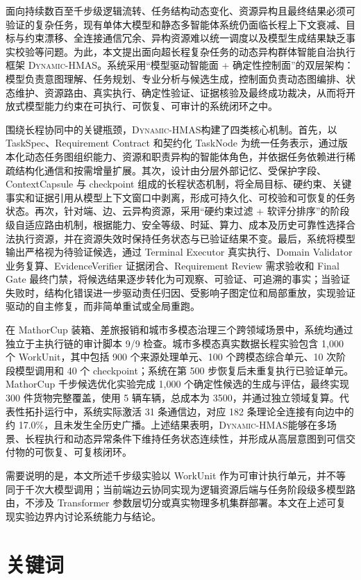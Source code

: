 \documentclass[UTF8,a4paper,12pt,oneside]{ctexbook}
\newcommand{\sys}{\textsc{Dynamic-HMAS}}
\begin{document}
面向持续数百至千步级逻辑流转、任务结构动态变化、资源异构且最终结果必须可验证的复杂任务，现有单体大模型和静态多智能体系统仍面临长程上下文衰减、目标与约束漂移、全连接通信冗余、异构资源难以统一调度以及模型生成结果缺乏事实校验等问题。为此，本文提出面向超长程复杂任务的动态异构群体智能自治执行框架 \sys{}。系统采用“模型驱动智能面 + 确定性控制面”的双层架构：模型负责意图理解、任务规划、专业分析与候选生成，控制面负责动态图编排、状态维护、资源路由、真实执行、确定性验证、证据核验及最终成功裁决，从而将开放式模型能力约束在可执行、可恢复、可审计的系统闭环之中。

围绕长程协同中的关键瓶颈，\sys{}构建了四类核心机制。首先，以 TaskSpec、Requirement Contract 和契约化 TaskNode 为统一任务表示，通过版本化动态任务图组织能力、资源和职责异构的智能体角色，并依据任务依赖进行稀疏结构化通信和按需增量扩展。其次，设计由分层外部记忆、受保护字段、ContextCapsule 与 checkpoint 组成的长程状态机制，将全局目标、硬约束、关键事实和证据引用从模型上下文窗口中剥离，形成可持久化、可校验和可恢复的任务状态。再次，针对端、边、云异构资源，采用“硬约束过滤 + 软评分排序”的阶段级自适应路由机制，根据能力、安全等级、时延、算力、成本及历史可靠性选择合法执行资源，并在资源失效时保持任务状态与已验证结果不变。最后，系统将模型输出严格视为待验证候选，通过 Terminal Executor 真实执行、Domain Validator 业务复算、EvidenceVerifier 证据闭合、Requirement Review 需求验收和 Final Gate 最终门禁，将候选结果逐步转化为可观察、可验证、可追溯的事实；当验证失败时，结构化错误进一步驱动责任归因、受影响子图定位和局部重放，实现验证驱动的自主修复，而非简单重试或全局重跑。

在 MathorCup 装箱、差旅报销和城市多模态治理三个跨领域场景中，系统均通过独立于主执行链的审计脚本 9/9 检查。城市多模态真实数据长程实验包含 1,000 个 WorkUnit，其中包括 900 个来源处理单元、100 个跨模态综合单元、10 次阶段模型调用和 40 个 checkpoint；系统在第 500 步恢复后未重复执行已验证单元。MathorCup 千步候选优化实验完成 1,000 个确定性候选的生成与评估，最终实现 300 件货物完整覆盖，使用 5 辆车辆，总成本为 3500，并通过独立领域复算。代表性拓扑运行中，系统实际激活 31 条通信边，对应 182 条理论全连接有向边中的约 17.0\%，且未发生全历史广播。上述结果表明，\sys{}能够在多场景、长程执行和动态异常条件下维持任务状态连续性，并形成从高层意图到可信交付物的可恢复、可复核闭环。

需要说明的是，本文所述千步级实验以 WorkUnit 作为可审计执行单元，并不等同于千次大模型调用；当前端边云协同实现为逻辑资源后端与任务阶段级多模型路由，不涉及 Transformer 参数层切分或真实物理多机集群部署。本文在上述可复现实验边界内讨论系统能力与结论。

\chapter*{关键词}
\end{document}
